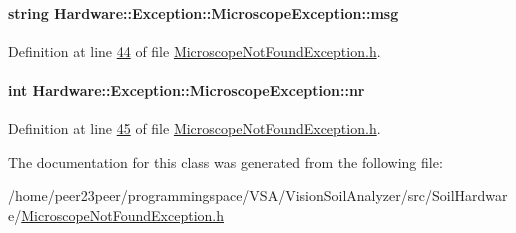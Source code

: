 \paragraph[{msg}]{\setlength{\rightskip}{0pt plus 5cm}string Hardware\+::\+Exception\+::\+Microscope\+Exception\+::msg\hspace{0.3cm}{\ttfamily [private]}}\label{class_hardware_1_1_exception_1_1_microscope_exception_aa3aa54f72b20d3510f9a9f8163ba1207}


Definition at line \hyperlink{_microscope_not_found_exception_8h_source_l00044}{44} of file \hyperlink{_microscope_not_found_exception_8h_source}{Microscope\+Not\+Found\+Exception.\+h}.

\hypertarget{class_hardware_1_1_exception_1_1_microscope_exception_aeb2684323ec9794783013431c9d7b95e}{}
\paragraph[{nr}]{\setlength{\rightskip}{0pt plus 5cm}int Hardware\+::\+Exception\+::\+Microscope\+Exception\+::nr\hspace{0.3cm}{\ttfamily [private]}}\label{class_hardware_1_1_exception_1_1_microscope_exception_aeb2684323ec9794783013431c9d7b95e}


Definition at line \hyperlink{_microscope_not_found_exception_8h_source_l00045}{45} of file \hyperlink{_microscope_not_found_exception_8h_source}{Microscope\+Not\+Found\+Exception.\+h}.



The documentation for this class was generated from the following file\+:\begin{DoxyCompactItemize}
\item 
/home/peer23peer/programmingspace/\+V\+S\+A/\+Vision\+Soil\+Analyzer/src/\+Soil\+Hardware/\hyperlink{_microscope_not_found_exception_8h}{Microscope\+Not\+Found\+Exception.\+h}\end{DoxyCompactItemize}
